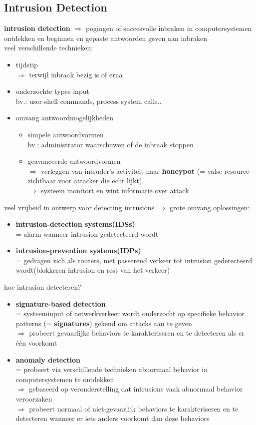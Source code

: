 \documentclass{report}
\begin{document}
\subsection{Intrusion Detection}
\textbf{intrusion detection} $\Rightarrow$ pogingen of succesvolle inbraken in computersystemen ontdekken en beginnen en gepaste antwoorden geven aan inbraken
\\veel verschillende technieken:
\begin{itemize}
\item tijdstip
\\$\Rightarrow$ terwijl inbraak bezig is of erna
\item onderzochte types input
\\bv.: user-shell commands, process system calls..
\item omvang antwoordmogelijkheden
\begin{itemize}
\item simpele antwoordvormen
 \\bv.: administrator waarschuwen of de inbraak stoppen
\item geavanceerde antwoordvormen
\\ $\Rightarrow$ verleggen van intruder's activiteit naar \textbf{honeypot} (= valse resource zichtbaar voor attacker die echt lijkt)
\\$\Rightarrow$ systeem monitort en wint informatie over attack
\end{itemize}
\end{itemize}
veel vrijheid in ontwerp voor detecting intrusions $\Rightarrow$ grote omvang oplossingen:
\begin{itemize}
\item \textbf{intrusion-detection systems(IDSs)} 
\\= alarm wanneer intrusion gedetecteerd wordt
\item \textbf{intrusion-prevention systems(IDPs)}
\\= gedragen zich als routers, met passerend verkeer tot intrusion gedetecteerd wordt(blokkeren intrusion en rest van het verkeer)
\end{itemize}
hoe intrusion detecteren?
\begin{itemize}
\item \textbf{signature-based detection} 
\\= systeeminput of netwerkverkeer wordt onderzocht op specifieke behavior patterns (= \textbf{signatures}) gekend om attacks aan te geven
\\$\Rightarrow$ probeert gevaarlijke behaviors te karakteriseren en te detecteren als er \'e\'en voorkomt
\item \textbf{anomaly detection}
\\= probeert via verschillende technieken abnormaal behavior in computersystemen te ontdekken
\\$\Rightarrow$ gebaseerd op veronderstelling dat intrusions vaak abnormaal behavior veroorzaken
\\$\Rightarrow$ probeert normaal of niet-gevaarlijk behaviors te karakteriseren en te detecteren wanneer er iets anders voorkomt dan deze behaviors

\end{itemize}
\end{document}
